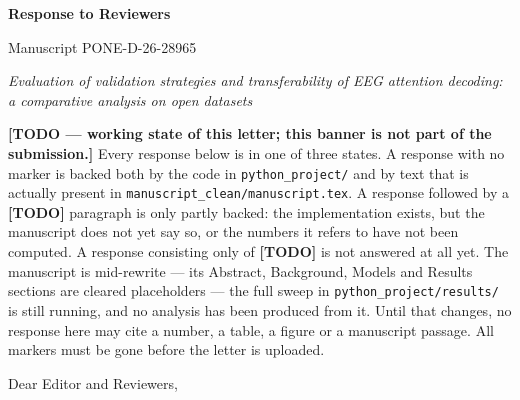\documentclass{article}
\begin{document}
%
%


\begin{center}
{\Large\bfseries Response to Reviewers}

\vspace{0.2cm}
Manuscript PONE-D-26-28965

\vspace{0.1cm}
\textit{Evaluation of validation strategies and transferability of EEG attention
decoding: a comparative analysis on open datasets}
\end{center}

\vspace{0.3cm}

\noindent
\textbf{[TODO --- working state of this letter; this banner is not part of the
submission.]} Every response below is in one of three states. A response with no
marker is backed both by the code in \texttt{python\_project/} and by text that is
actually present in \texttt{manuscript\_clean/manuscript.tex}. A response
followed by a \textbf{[TODO]} paragraph is only partly backed: the
implementation exists, but the manuscript does not yet say so, or the numbers it
refers to have not been computed. A response consisting only of \textbf{[TODO]}
is not answered at all yet. The manuscript is mid-rewrite --- its Abstract,
Background, Models and Results sections are cleared placeholders --- the full
sweep in \texttt{python\_project/results/} is still running, and no analysis has
been produced from it. Until that changes, no response here may cite a number, a
table, a figure or a manuscript passage. All markers must be gone before the
letter is uploaded.

\vspace{0.3cm}
\noindent
Dear Editor and Reviewers,
\end{document}
